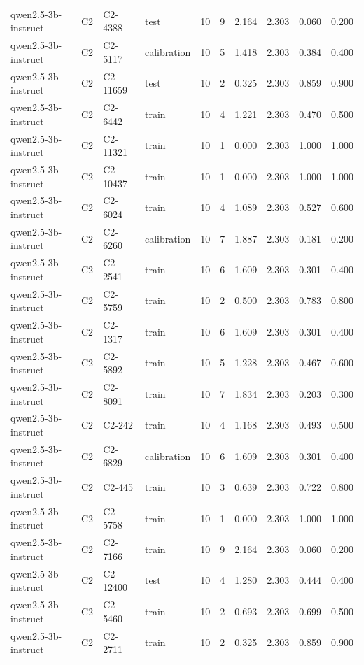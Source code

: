 \begin{table}
\begin{tabular}{llllrrrrrr}
qwen2.5-3b-instruct & C2 & C2-4388 & test & 10 & 9 & 2.164 & 2.303 & 0.060 & 0.200 \\
qwen2.5-3b-instruct & C2 & C2-5117 & calibration & 10 & 5 & 1.418 & 2.303 & 0.384 & 0.400 \\
qwen2.5-3b-instruct & C2 & C2-11659 & test & 10 & 2 & 0.325 & 2.303 & 0.859 & 0.900 \\
qwen2.5-3b-instruct & C2 & C2-6442 & train & 10 & 4 & 1.221 & 2.303 & 0.470 & 0.500 \\
qwen2.5-3b-instruct & C2 & C2-11321 & train & 10 & 1 & 0.000 & 2.303 & 1.000 & 1.000 \\
qwen2.5-3b-instruct & C2 & C2-10437 & train & 10 & 1 & 0.000 & 2.303 & 1.000 & 1.000 \\
qwen2.5-3b-instruct & C2 & C2-6024 & train & 10 & 4 & 1.089 & 2.303 & 0.527 & 0.600 \\
qwen2.5-3b-instruct & C2 & C2-6260 & calibration & 10 & 7 & 1.887 & 2.303 & 0.181 & 0.200 \\
qwen2.5-3b-instruct & C2 & C2-2541 & train & 10 & 6 & 1.609 & 2.303 & 0.301 & 0.400 \\
qwen2.5-3b-instruct & C2 & C2-5759 & train & 10 & 2 & 0.500 & 2.303 & 0.783 & 0.800 \\
qwen2.5-3b-instruct & C2 & C2-1317 & train & 10 & 6 & 1.609 & 2.303 & 0.301 & 0.400 \\
qwen2.5-3b-instruct & C2 & C2-5892 & train & 10 & 5 & 1.228 & 2.303 & 0.467 & 0.600 \\
qwen2.5-3b-instruct & C2 & C2-8091 & train & 10 & 7 & 1.834 & 2.303 & 0.203 & 0.300 \\
qwen2.5-3b-instruct & C2 & C2-242 & train & 10 & 4 & 1.168 & 2.303 & 0.493 & 0.500 \\
qwen2.5-3b-instruct & C2 & C2-6829 & calibration & 10 & 6 & 1.609 & 2.303 & 0.301 & 0.400 \\
qwen2.5-3b-instruct & C2 & C2-445 & train & 10 & 3 & 0.639 & 2.303 & 0.722 & 0.800 \\
qwen2.5-3b-instruct & C2 & C2-5758 & train & 10 & 1 & 0.000 & 2.303 & 1.000 & 1.000 \\
qwen2.5-3b-instruct & C2 & C2-7166 & train & 10 & 9 & 2.164 & 2.303 & 0.060 & 0.200 \\
qwen2.5-3b-instruct & C2 & C2-12400 & test & 10 & 4 & 1.280 & 2.303 & 0.444 & 0.400 \\
qwen2.5-3b-instruct & C2 & C2-5460 & train & 10 & 2 & 0.693 & 2.303 & 0.699 & 0.500 \\
qwen2.5-3b-instruct & C2 & C2-2711 & train & 10 & 2 & 0.325 & 2.303 & 0.859 & 0.900 \\

\end{tabular}
\end{table}
